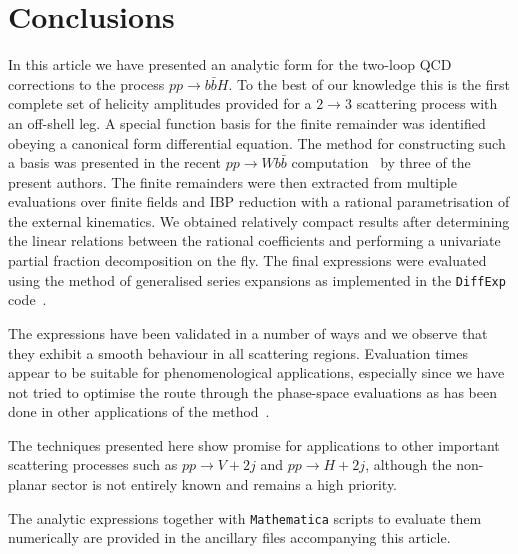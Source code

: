\documentclass[main.tex]{subfiles}
\begin{document}
\section{Conclusions}
\label{Hbbsec:conclusions}

In this article we have presented an analytic form for the two-loop QCD corrections to the process
$pp\to b\bar{b}H$. To the best of our knowledge this is the first complete set of helicity
amplitudes provided for a $2\to 3$ scattering process with an off-shell leg. A special function basis for
the finite remainder was identified obeying a canonical form differential equation. The method for
constructing such a basis was presented in the recent $pp\to Wb\bar{b}$ computation~\cite{Badger:2021nhg} by three of the present
authors. The finite remainders were then extracted from multiple
evaluations over finite fields and IBP reduction with a rational parametrisation of the external kinematics.
We obtained relatively compact results after determining the linear relations between the rational coefficients and
performing a univariate partial fraction decomposition on the fly. The final expressions were evaluated using the method of generalised series expansions as implemented in the \texttt{DiffExp} code~\cite{Hidding:2020ytt}.

The expressions have been validated in a number of ways and we observe that they exhibit a smooth behaviour in all
scattering regions. Evaluation times appear to be suitable for phenomenological applications,
especially since we have not tried to optimise the route through the phase-space evaluations as has
been done in other applications of the method~\cite{Frellesvig:2019byn,Abreu:2020jxa,Becchetti:2020wof,Bonciani:2021zzf,abreu2021twoloop}.

The techniques presented here show promise for applications to other important scattering processes such
as $pp\to V+2j$ and $pp\to H+2j$, although the non-planar sector is not entirely known and remains a high priority.

The analytic expressions together with \texttt{Mathematica} scripts to evaluate them numerically are provided in the ancillary files accompanying this article.
\end{document}
